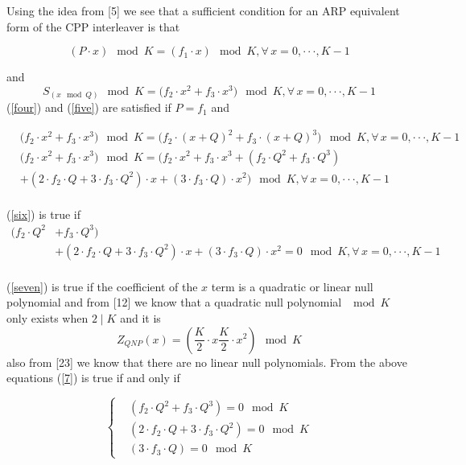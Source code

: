 \documentclass[fontsize=12pt]{article}
\begin{document}
Using the idea from [5] we see that a sufficient condition for an ARP equivalent form of the CPP interleaver is that

\begin{equation}
(P\cdot x) \mod K =(f_1\cdot x) \mod K, \forall \,x= 0,\cdot\cdot\cdot,K-1
\label{four}
\end{equation}

and 
\begin{equation}
 S_{(x \mod Q)}\mod K = \Big(f_2\cdot x^2 +f_3 \cdot x^3\Big) \mod K,\forall \,x= 0,\cdot\cdot\cdot,K-1
 \label{five}
\end{equation}
(\ref{four}) and (\ref{five}) are satisfied if $P=f_1$ and

\begin{equation}
\begin{split}
&\Big(f_2\cdot x^2 +f_3 \cdot x^3\Big) \mod K = \Big(f_2\cdot (x+Q)^2 +f_3 \cdot (x+Q)^3\Big) \mod K ,\forall \,x= 0,\cdot\cdot\cdot,K-1\\
&\Big(f_2\cdot x^2 +f_3 \cdot x^3\Big) \mod K = \Big(f_2\cdot x^2 +f_3 \cdot x^3 + (f_2\cdot Q^2 +f_3 \cdot Q^3)\\
&+(2\cdot f_2 \cdot Q +3\cdot f_3 \cdot Q^2)\cdot x + (3\cdot f_3 \cdot Q)\cdot x^2 \Big) \mod K ,\forall \,x= 0,\cdot\cdot\cdot,K-1\\
\label{six}
\end{split}
\end{equation}

(\ref{six}) is true if 
\begin{equation}
\begin{split}
  (f_2\cdot Q^2 &+f_3 \cdot Q^3)\\
&+(2\cdot f_2 \cdot Q +3\cdot f_3 \cdot Q^2)\cdot x + (3\cdot f_3 \cdot Q)\cdot x^2 = 0 \mod K ,\forall \,x= 0,\cdot\cdot\cdot,K-1\\
\label{seven}
\end{split}
\end{equation}

(\ref{seven}) is true if the coefficient of the $x$ term is a quadratic or linear null polynomial and from [12] we know that a quadratic null polynomial $\mod K$ only exists when $2\mid K$ and it is
\begin{equation}
Z_{QNP}(x) = (\frac{K}{2}\cdot x \frac{K}{2}\cdot x^2) \mod K
\end{equation}
also from [23] we know that there are no linear null polynomials. From the above equations (\ref{7}) is true if and only if


\begin{equation}
    \begin{cases}
      &(f_2\cdot Q^2 +f_3 \cdot Q^3) = 0 \mod K \\
      &(2\cdot f_2 \cdot Q +3\cdot f_3 \cdot Q^2) = 0 \mod K\\
      &(3\cdot f_3 \cdot Q)= 0 \mod K
    \end{cases}
    \label{nine}
  \end{equation}
  
\end{document}
